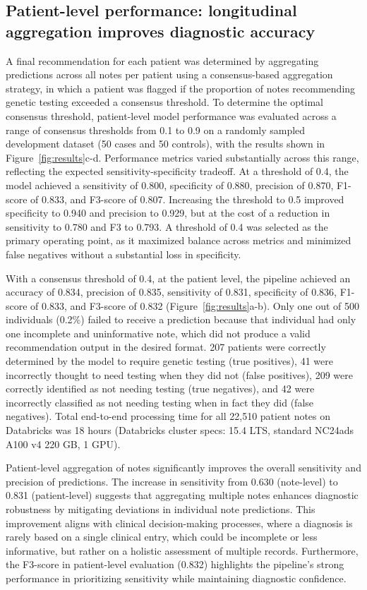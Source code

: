 \documentclass[fleqn,10pt]{wlscirep}
\begin{document}
\subsection*{Patient-level performance: longitudinal aggregation improves diagnostic accuracy}
A final recommendation for each patient was determined by aggregating predictions across all notes per patient using a consensus-based aggregation strategy, in which a patient was flagged if the proportion of notes recommending genetic testing exceeded a consensus threshold. To determine the optimal consensus threshold, patient-level model performance was evaluated across a range of consensus thresholds from 0.1 to 0.9 on a randomly sampled development dataset (50 cases and 50 controls), with the results shown in Figure~\ref{fig:results}c-d. Performance metrics varied substantially across this range, reflecting the expected sensitivity-specificity tradeoff. At a threshold of 0.4, the model achieved a sensitivity of 0.800, specificity of 0.880, precision of 0.870, F1-score of 0.833, and F3-score of 0.807. Increasing the threshold to 0.5 improved specificity to 0.940 and precision to 0.929, but at the cost of a reduction in sensitivity to 0.780 and F3 to 0.793. A threshold of 0.4 was selected as the primary operating point, as it maximized balance across metrics and minimized false negatives without a substantial loss in specificity. 

With a consensus threshold of 0.4, at the patient level, the pipeline achieved an accuracy of 0.834, precision of 0.835, sensitivity of 0.831, specificity of 0.836, F1-score of 0.833, and F3-score of 0.832 (Figure~\ref{fig:results}a-b). Only one out of 500 individuals (0.2\%) failed to receive a prediction because that individual had only one incomplete and uninformative note, which did not produce a valid recommendation output in the desired format. 207 patients were correctly determined by the model to require genetic testing (true positives), 41 were incorrectly thought to need testing when they did not (false positives), 209 were correctly identified as not needing testing (true negatives), and 42 were incorrectly classified as not needing testing when in fact they did (false negatives). Total end-to-end processing time for all 22,510 patient notes on Databricks was 18 hours (Databricks cluster specs: 15.4 LTS, standard NC24ads A100 v4 220 GB, 1 GPU). 

Patient-level aggregation of notes significantly improves the overall sensitivity and precision of predictions. The increase in sensitivity from 0.630 (note-level) to 0.831 (patient-level) suggests that aggregating multiple notes enhances diagnostic robustness by mitigating deviations in individual note predictions. This improvement aligns with clinical decision-making processes, where a diagnosis is rarely based on a single clinical entry, which could be incomplete or less informative, but rather on a holistic assessment of multiple records. Furthermore, the F3-score in patient-level evaluation (0.832) highlights the pipeline’s strong performance in prioritizing sensitivity while maintaining diagnostic confidence.
\end{document}
